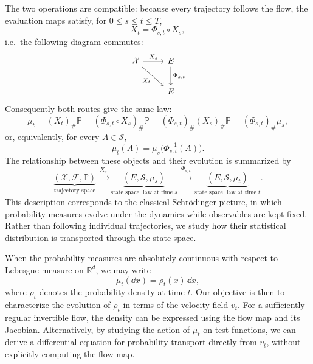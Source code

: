 \documentclass[12pt,a4paper,oneside]{book}
\begin{document}
The two operations are compatible: because every trajectory follows the flow, the evaluation maps satisfy, for
$0\leq s\leq t\leq T$,
\begin{equation*}
    X_t=\Phi_{s,t}\circ X_s,
\end{equation*}
i.e.\ the following diagram commutes:
\begin{equation*}
    \begin{tikzcd}[column sep=2.4em, row sep=2.2em]
        \mathcal X \arrow[r, "X_s"] \arrow[dr, "X_t"'] & E \arrow[d, "\Phi_{s,t}"] \\
        & E
    \end{tikzcd}
\end{equation*}
Consequently both routes give the same law:
\begin{equation*}
    \mu_t=(X_t)_\#\mathbb P
        =(\Phi_{s,t}\circ X_s)_\#\mathbb P
        =(\Phi_{s,t})_\#(X_s)_\#\mathbb P
        =(\Phi_{s,t})_\#\mu_s,
\end{equation*}
or, equivalently, for every $A\in\mathcal S$,
\begin{equation*}
    \mu_t(A)=\mu_s\bigl(\Phi_{s,t}^{-1}(A)\bigr).
\end{equation*}
The relationship between these objects and their evolution is summarized by
\begin{equation*}
    \underbrace{(\mathcal X,\mathcal F,\mathbb P)}_{\text{trajectory space}}
    \xrightarrow{\ X_s\ }
    \underbrace{(E,\mathcal S,\mu_s)}_{\text{state space, law at time }s}
    \xrightarrow{\ \Phi_{s,t}\ }
    \underbrace{(E,\mathcal S,\mu_t)}_{\text{state space, law at time }t}.
\end{equation*}
This description corresponds to the classical Schr\"odinger picture, in which probability measures evolve under the dynamics 
while observables are kept fixed. Rather than following individual trajectories, we study how their statistical distribution 
is transported through the state space.

When the probability measures are absolutely continuous with respect to Lebesgue measure on $\mathbb R^d$, we may write
\begin{equation*}
    \mu_t(\dd x)=\rho_t(x)\,\dd x,
\end{equation*}
where $\rho_t$ denotes the probability density at time $t$. Our objective is then to characterize the evolution of $\rho_t$ 
in terms of the velocity field $v_t$. For a sufficiently regular invertible flow, the density can be expressed using the 
flow map and its Jacobian. Alternatively, by studying the action of $\mu_t$ on test functions, we can derive a differential 
equation for probability transport directly from $v_t$, without explicitly computing the flow map.
\end{document}

